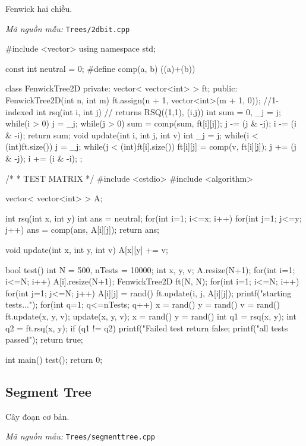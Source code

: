 \documentclass[11pt]{article}
\newcommand{\codepath}[1]{\par\noindent\textit{Mã nguồn mẫu:} \texttt{#1}\par}
\begin{document}
Fenwick hai chiều.

\codepath{Trees/2dbit.cpp}

\begingroup\scriptsize
\begin{vncode}
#include <vector>
using namespace std;

const int neutral = 0;
#define comp(a, b) ((a)+(b))

class FenwickTree2D {
private:
	vector< vector<int> > ft;
public:
	FenwickTree2D(int n, int m) {
		ft.assign(n + 1, vector<int>(m + 1, 0));	//1-indexed
	}
	int rsq(int i, int j) { // returns RSQ((1,1), (i,j))
		int sum = 0, _j = j;
		while(i > 0) {
			j = _j;
			while(j > 0) {
				sum = comp(sum, ft[i][j]);
				j -= (j & -j);
			}
			i -= (i & -i);
		}
		return sum;
	}
	void update(int i, int j, int v) {
		int _j = j;
		while(i < (int)ft.size()) {
			j = _j;
			while(j < (int)ft[i].size()) {
				ft[i][j] = comp(v, ft[i][j]);
				j += (j & -j);
			}
			i += (i & -i);
		}
	}
};

/*
 *	TEST MATRIX
 */
#include <cstdio>
#include <algorithm>

vector< vector<int> > A;

int rsq(int x, int y) {
	int ans = neutral;
	for(int i=1; i<=x; i++) {
		for(int j=1; j<=y; j++) {
			ans = comp(ans, A[i][j]);
		}
	}
	return ans;
}

void update(int x, int y, int v) {
	A[x][y] += v;
}

bool test() {
	int N = 500, nTests = 10000;
	int x, y, v;
	A.resize(N+1);
	for(int i=1; i<=N; i++) A[i].resize(N+1);
	FenwickTree2D ft(N, N);
	for(int i=1; i<=N; i++) {
		for(int j=1; j<=N; j++) {
			A[i][j] = rand() %
			ft.update(i, j, A[i][j]);
		}
	}
	printf("starting tests...\n");
	for(int q=1; q<=nTests; q++) {
		x = rand()%
		y = rand()%
		v = rand()%
		ft.update(x, y, v);
		update(x, y, v);
		x = rand()%
		y = rand()%
		int q1 = rsq(x, y);
		int q2 = ft.rsq(x, y);
		if (q1 != q2) {
			printf("Failed test %
			return false;
		}
	}
	printf("all tests passed\n");
	return true;
}

int main() {
	test();
	return 0;
}
\end{vncode}
\endgroup


\subsection{Segment Tree}

Cây đoạn cơ bản.

\codepath{Trees/segmenttree.cpp}
\end{document}
